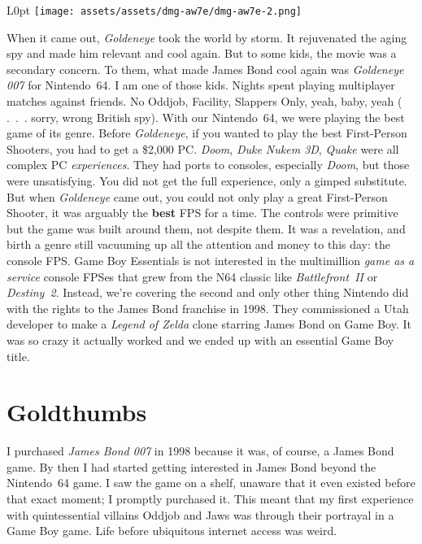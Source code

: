 \documentclass{book}
\begin{document}
\begin{wrapfigure}{L}{0pt} \texttt{[image: assets/assets/dmg-aw7e/dmg-aw7e-2.png]}\end{wrapfigure}
When it came out, \emph{Goldeneye} took the world by storm. It rejuvenated the aging spy and made him relevant and cool again. But to some kids, the movie was a secondary concern. To them, what made James Bond cool again was \emph{Goldeneye 007} for Nintendo 64. I am one of those kids. Nights spent playing multiplayer matches against friends. No Oddjob, Facility, Slappers Only, yeah, baby, yeah ( . . . sorry, wrong British spy). With our Nintendo 64, we were playing the best game of its genre. Before \emph{Goldeneye}, if you wanted to play the best First-Person Shooters, you had to get a \$2,000 PC. \emph{Doom}, \emph{Duke Nukem 3D}, \emph{Quake} were all complex PC \emph{experiences}. They had ports to consoles, especially \emph{Doom}, but those were unsatisfying. You did not get the full experience, only a gimped substitute. But when \emph{Goldeneye} came out, you could not only play a great First-Person Shooter, it was arguably the \textbf{best} FPS for a time. The controls were primitive but the game was built around them, not despite them. It was a revelation, and birth a genre still vacuuming up all the attention and money to this day: the console FPS. Game Boy Essentials is not interested in the multimillion \emph{game as a service} console FPSes that grew from the N64 classic like \emph{Battlefront II} or \emph{Destiny 2}. Instead, we’re covering the second and only other thing Nintendo did with the rights to the James Bond franchise in 1998. They commissioned a Utah developer to make a \emph{Legend of Zelda} clone starring James Bond on Game Boy. It was so crazy it actually worked and we ended up with an essential Game Boy title.

\FloatBarrier\needspace{5pt}\section*{Goldthumbs}\nopagebreak[4]

I purchased \emph{James Bond 007} in 1998 because it was, of course, a James Bond game. By then I had started getting interested in James Bond beyond the Nintendo 64 game. I saw the game on a shelf, unaware that it even existed before that exact moment; I promptly purchased it. This meant that my first experience with quintessential villains Oddjob and Jaws was through their portrayal in a Game Boy game. Life before ubiquitous internet access was weird.
\end{document}
